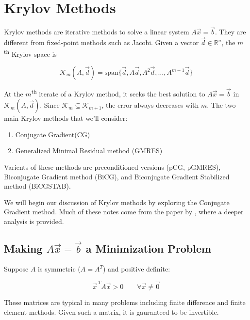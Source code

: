 
\section{Krylov Methods}

Krylov methods are iterative methods to solve a linear system $A\vec{x}=\vec{b}$. They are different from fixed-point methods such as Jacobi. Given a vector $\vec{d}\in \mathbb{R}^n$, the $m$\textsuperscript{th} Krylov space is

\begin{equation*}
    \mathcal{K}_m (A, \vec{d}) = \text{span}\{ \vec{d}, A\vec{d}, A^2 \vec{d}, \ldots, A^{m-1}\vec{d}\}
\end{equation*}

At the $m$\textsuperscript{th} iterate of a Krylov method, it seeks the best solution to $A\vec{x}=\vec{b}$ in $\mathcal{K}_m(A, \vec{d})$. Since $\mathcal{K}_m \subseteq \mathcal{K}_{m+1}$, the error always decreases with $m$. The two main Krylov methods that we'll consider:

\begin{enumerate}[1)]
    \item Conjugate Gradient(CG)
    \item Generalized Minimal Residual method (GMRES)
\end{enumerate}

Varients of these methods are preconditioned versions (pCG, pGMRES), Biconjugate Gradient method (BiCG), and Biconjugate Gradient Stabilized method (BiCGSTAB).

We will begin our discussion of Krylov methods by exploring the Conjugate Gradient method. Much of these notes come from the paper by \cite{shewchuk-1994} , where a deeper analysis is provided.

\subsection{Making $A\vec{x}=\vec{b}$ a Minimization Problem}

Suppose $A$ is symmetric ($A=A^T$) and positive definite:

\begin{equation*}
    \vec{x}^{\,T}A\vec{x} > 0 \qquad \forall \vec{x}\neq\vec{0}
\end{equation*}

These matrices are typical in many problems including finite difference and finite element methods. Given such a matrix, it is gauranteed to be invertible.

